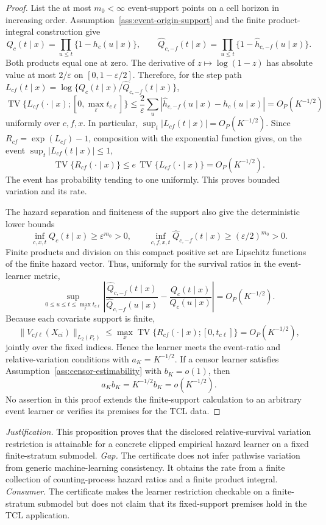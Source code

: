 \documentclass{article}
\begin{document}
\begin{proof}
List the at most \(m_0<\infty\) event-support points on a cell horizon in increasing order. Assumption~\ref{ass:event-origin-support} and the finite product-integral construction give
\[
 Q_c(t\mid x)=\prod_{u\le t}\{1-h_c(u\mid x)\},
 \qquad
 \widehat Q_{c,-f}(t\mid x)=\prod_{u\le t}\{1-\widehat h_{c,-f}(u\mid x)\}.
\]
Both products equal one at zero. The derivative of \(z\mapsto\log(1-z)\) has absolute value at most \(2/\varepsilon\) on \([0,1-\varepsilon/2]\). Therefore, for the step path
\(L_{cf}(t\mid x)=\log\{Q_c(t\mid x)/\widehat Q_{c,-f}(t\mid x)\}\),
\[
 \operatorname{TV}\{L_{cf}(\mathord\cdot\mid x);[0,\max_\ell t_{c\ell}]\}
 \le \frac{2}{\varepsilon}\sum_u
 |\widehat h_{c,-f}(u\mid x)-h_c(u\mid x)|
 =O_P(K^{-1/2})
\]
uniformly over \(c,f,x\). In particular, \(\sup_t|L_{cf}(t\mid x)|=O_P(K^{-1/2})\). Since \(R_{cf}=\exp(L_{cf})-1\), composition with the exponential function gives, on the event \(\sup_t|L_{cf}(t\mid x)|\le1\),
\[
 \operatorname{TV}\{R_{cf}(\mathord\cdot\mid x)\}
 \le e\,\operatorname{TV}\{L_{cf}(\mathord\cdot\mid x)\}
 =O_P(K^{-1/2}).
\]
The event has probability tending to one uniformly. This proves bounded variation and its rate.

The hazard separation and finiteness of the support also give the deterministic lower bounds
\[
 \inf_{c,x,t}Q_c(t\mid x)\ge\varepsilon^{m_0}>0,
 \qquad
 \inf_{c,f,x,t}\widehat Q_{c,-f}(t\mid x)\ge(\varepsilon/2)^{m_0}>0.
\]
Finite products and division on this compact positive set are Lipschitz functions of the finite hazard vector. Thus, uniformly for the survival ratios in the event-learner metric,
\[
 \sup_{0\le u\le t\le\max_\ell t_{c\ell}}
 \left|\frac{\widehat Q_{c,-f}(t\mid x)}{\widehat Q_{c,-f}(u\mid x)}
 -\frac{Q_c(t\mid x)}{Q_c(u\mid x)}\right|=O_P(K^{-1/2}).
\]
Because each covariate support is finite,
\[
 \|V_{cf\ell}(X_{ci})\|_{L_2(P_c)}
 \le\max_x\operatorname{TV}\{R_{cf}(\mathord\cdot\mid x);[0,t_{c\ell}]\}
 =O_P(K^{-1/2}),
\]
jointly over the fixed indices. Hence the learner meets the event-ratio and relative-variation conditions with \(a_K=K^{-1/2}\). If a censor learner satisfies Assumption~\ref{ass:censor-estimability} with \(b_K=o(1)\), then
\[
 a_Kb_K=K^{-1/2}b_K=o(K^{-1/2}).
\]
No assertion in this proof extends the finite-support calculation to an arbitrary event learner or verifies its premises for the TCL data.
\end{proof}
\par\smallskip\noindent \textit{Justification.} This proposition proves that the disclosed relative-survival variation restriction is attainable for a concrete clipped empirical hazard learner on a fixed finite-stratum submodel. \textit{Gap.} The certificate does not infer pathwise variation from generic machine-learning consistency. It obtains the rate from a finite collection of counting-process hazard ratios and a finite product integral. \textit{Consumer.} The certificate makes the learner restriction checkable on a finite-stratum submodel but does not claim that its fixed-support premises hold in the TCL application.
\end{document}
